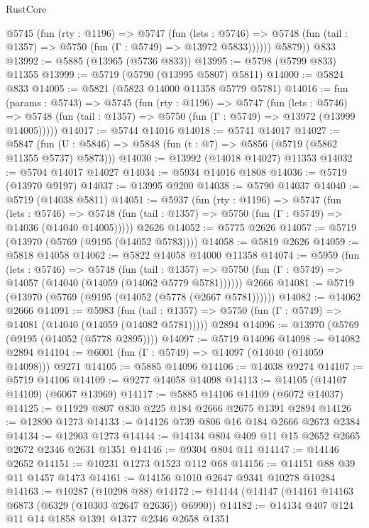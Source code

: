 \begin{lexlean}{RustCore}
\begin{coremodule}
          @5745
            (fun (rty : @1196) =>
            @5747
              (fun (lets : @5746) =>
              @5748 (fun (tail : @1357) => @5750 (fun (Γ : @5749) => @13972 @5833))))))
        @5879))
    @833
@13992 := @5885 (@13965 (@5736 @833))
@13995 := @5798 (@5799 @833) @11355
@13999 := @5719 (@5790 (@13995 @5807) @5811)
@14000 := @5824 @833
@14005 := @5821 (@5823 @14000 @11358 @5779 @5781)
@14016 := fun (params : @5743) =>
  @5745
    (fun (rty : @1196) =>
    @5747
      (fun (lets : @5746) =>
      @5748 (fun (tail : @1357) => @5750 (fun (Γ : @5749) => @13972 (@13999 @14005)))))
@14017 := @5744 @14016
@14018 := @5741 @14017
@14027 := @5847
    (fun (U : @5846) => @5848 (fun (t : @7) => @5856 (@5719 (@5862 @11355 @5737) @5873)))
@14030 := @13992 (@14018 @14027) @11353
@14032 := @5704 @14017 @14027
@14034 := @5934 @14016 @1808
@14036 := @5719 (@13970 @9197)
@14037 := @13995 @9200
@14038 := @5790 @14037
@14040 := @5719 (@14038 @5811)
@14051 := @5937
    (fun (rty : @1196) =>
    @5747
      (fun (lets : @5746) =>
      @5748 (fun (tail : @1357) => @5750 (fun (Γ : @5749) => @14036 (@14040 @14005)))))
    @2626
@14052 := @5775 @2626
@14057 := @5719 (@13970 (@5769 (@9195 (@14052 @5783))))
@14058 := @5819 @2626
@14059 := @5818 @14058
@14062 := @5822 @14058 @14000 @11358
@14074 := @5959
    (fun (lets : @5746) =>
    @5748
      (fun (tail : @1357) =>
      @5750 (fun (Γ : @5749) => @14057 (@14040 (@14059 (@14062 @5779 @5781))))))
    @2666
@14081 := @5719 (@13970 (@5769 (@9195 (@14052 (@5778 (@2667 @5781))))))
@14082 := @14062 @2666
@14091 := @5983
    (fun (tail : @1357) => @5750 (fun (Γ : @5749) => @14081 (@14040 (@14059 (@14082 @5781)))))
    @2894
@14096 := @13970 (@5769 (@9195 (@14052 (@5778 @2895))))
@14097 := @5719 @14096
@14098 := @14082 @2894
@14104 := @6001 (fun (Γ : @5749) => @14097 (@14040 (@14059 @14098))) @9271
@14105 := @5885 @14096
@14106 := @14038 @9274
@14107 := @5719 @14106
@14109 := @9277 @14058 @14098
@14113 := @14105 (@14107 @14109) (@6067 @13969)
@14117 := @5885 @14106 @14109 (@6072 @14037)
@14125 := @11929 @807 @830 @225 @184 @2666 @2675 @1391 @2894
@14126 := @12890 @1273
@14133 := @14126 @739 @806 @16 @184 @2666 @2673 @2384
@14134 := @12903 @1273
@14144 := @14134 @804 @409 @11 @15 @2652 @2665 @2672 @2346 @2631 @1351
@14146 := @9304 @804 @11
@14147 := @14146 @2652
@14151 := @10231 @1273 @1523 @112 @68
@14156 := @14151 @88 @39 @11 @1457 @1473
@14161 := @14156 @1010 @2647 @9341 @10278 @10284
@14163 := @10287 (@10298 @88)
@14172 := @14144 (@14147 (@14161 @14163 @6873 (@6329 (@10303 @2647 @2636)) @6990))
@14182 := @14134 @407 @124 @11 @14 @1858 @1391 @1377 @2346 @2658 @1351

\end{coremodule}
\end{lexlean}
